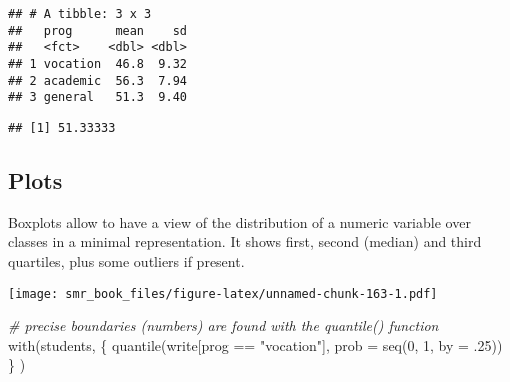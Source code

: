\documentclass[
  oneside]{book}
\newenvironment{Shaded}{\begin{snugshade}}{\end{snugshade}}
\newcommand{\AttributeTok}[1]{\textcolor[rgb]{0.77,0.63,0.00}{#1}}
\newcommand{\CommentTok}[1]{\textcolor[rgb]{0.56,0.35,0.01}{\textit{#1}}}
\newcommand{\DecValTok}[1]{\textcolor[rgb]{0.00,0.00,0.81}{#1}}
\newcommand{\FunctionTok}[1]{\textcolor[rgb]{0.00,0.00,0.00}{#1}}
\newcommand{\NormalTok}[1]{#1}
\newcommand{\SpecialCharTok}[1]{\textcolor[rgb]{0.00,0.00,0.00}{#1}}
\newcommand{\StringTok}[1]{\textcolor[rgb]{0.31,0.60,0.02}{#1}}
\begin{document}
\begin{verbatim}
## # A tibble: 3 x 3
##   prog      mean    sd
##   <fct>    <dbl> <dbl>
## 1 vocation  46.8  9.32
## 2 academic  56.3  7.94
## 3 general   51.3  9.40
\end{verbatim}

\begin{Shaded}
\end{Shaded}

\begin{verbatim}
## [1] 51.33333
\end{verbatim}

\hypertarget{plots}{%
\subsection{Plots}\label{plots}}

Boxplots allow to have a view of the distribution of a
numeric variable over classes in a minimal representation.
It shows first, second (median) and third quartiles, plus
some outliers if present.

\begin{Shaded}
\end{Shaded}

\texttt{[image: smr\_book\_files/figure-latex/unnamed-chunk-163-1.pdf]}

\begin{Shaded}
\begin{Highlighting}[]
\CommentTok{\# precise boundaries (numbers) are found with the \textasciigrave{}quantile()\textasciigrave{} function}
\FunctionTok{with}\NormalTok{(students, \{}
  \FunctionTok{quantile}\NormalTok{(write[prog }\SpecialCharTok{==} \StringTok{"vocation"}\NormalTok{], }\AttributeTok{prob =} \FunctionTok{seq}\NormalTok{(}\DecValTok{0}\NormalTok{, }\DecValTok{1}\NormalTok{, }\AttributeTok{by =}\NormalTok{ .}\DecValTok{25}\NormalTok{))}
\NormalTok{  \}}
\NormalTok{)}
\end{Highlighting}
\end{Shaded}
\end{document}
